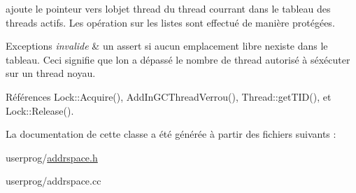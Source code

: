 ajoute le pointeur vers l\textquotesingle{}objet thread du thread courrant dans le tableau des threads actifs. Les opération sur les listes sont effectué de manière protégées. 


\begin{DoxyExceptions}{Exceptions}
{\em invalide} & un assert si aucun emplacement libre n\textquotesingle{}existe dans le tableau. Ceci signifie que l\textquotesingle{}on a dépassé le nombre de thread autorisé à s\textquotesingle{}éxécuter sur un thread noyau. \\
\hline
\end{DoxyExceptions}


Références Lock\+::\+Acquire(), Add\+In\+G\+C\+Thread\+Verrou(), Thread\+::get\+T\+I\+D(), et Lock\+::\+Release().



La documentation de cette classe a été générée à partir des fichiers suivants \+:\begin{DoxyCompactItemize}
\item 
userprog/\hyperlink{addrspace_8h}{addrspace.\+h}\item 
userprog/addrspace.\+cc\end{DoxyCompactItemize}
